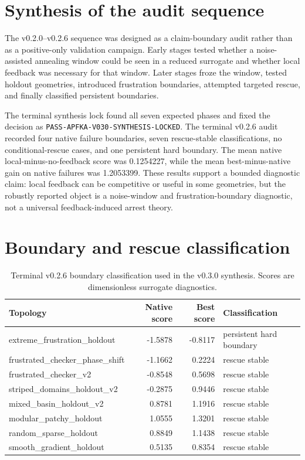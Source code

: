 \documentclass[11pt]{article}
\begin{document}
\section{Synthesis of the audit sequence}
The v0.2.0--v0.2.6 sequence was designed as a claim-boundary audit rather than as a positive-only validation campaign. Early stages tested whether a noise-assisted annealing window could be seen in a reduced surrogate and whether local feedback was necessary for that window. Later stages froze the window, tested holdout geometries, introduced frustration boundaries, attempted targeted rescue, and finally classified persistent boundaries.

The terminal synthesis lock found all seven expected phases and fixed the decision as \texttt{PASS-APFKA-V030-SYNTHESIS-LOCKED}. The terminal v0.2.6 audit recorded four native failure boundaries, seven rescue-stable classifications, no conditional-rescue cases, and one persistent hard boundary. The mean native local-minus-no-feedback score was 0.1254227, while the mean best-minus-native gain on native failures was 1.2053399. These results support a bounded diagnostic claim: local feedback can be competitive or useful in some geometries, but the robustly reported object is a noise-window and frustration-boundary diagnostic, not a universal feedback-induced arrest theory.

\section{Boundary and rescue classification}
\begin{table}[H]
\centering
\caption{Terminal v0.2.6 boundary classification used in the v0.3.0 synthesis. Scores are dimensionless surrogate diagnostics.}
\begin{tabular}{lrrl}
\toprule
Topology & Native score & Best score & Classification\\
\midrule
extreme\_frustration\_holdout & -1.5878 & -0.8117 & persistent hard boundary\\
frustrated\_checker\_phase\_shift & -1.1662 & 0.2224 & rescue stable\\
frustrated\_checker\_v2 & -0.8548 & 0.5698 & rescue stable\\
striped\_domains\_holdout\_v2 & -0.2875 & 0.9446 & rescue stable\\
mixed\_basin\_holdout\_v2 & 0.8781 & 1.1916 & rescue stable\\
modular\_patchy\_holdout & 1.0555 & 1.3201 & rescue stable\\
random\_sparse\_holdout & 0.8849 & 1.1438 & rescue stable\\
smooth\_gradient\_holdout & 0.5135 & 0.8354 & rescue stable\\
\bottomrule
\end{tabular}
\end{table}
\end{document}
